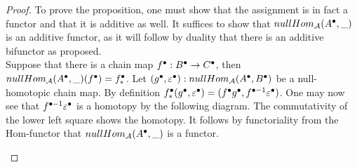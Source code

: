     \begin{proof}
        To prove the proposition, one must show that the assignment is in fact a functor and that it is additive as well. It suffices to show that $nullHom_{\mathcal{A}}(A^{\bullet},\_)$ is an additive functor, as it will follow by duality that there is an additive bifunctor as proposed. \\
        
        Suppose that there is a chain map $f^{\bullet}:B^{\bullet}\rightarrow C^{\bullet}$, then $nullHom_{\mathcal{A}}(A^{\bullet},\_)(f^{\bullet})=f^{\bullet}_*$. Let $(g^{\bullet},\varepsilon^{\bullet}):nullHom_{\mathcal{A}}(A^{\bullet},B^{\bullet})$ be a null-homotopic chain map. By definition $f^{\bullet}_*(g^{\bullet},\varepsilon^{\bullet})=(f^{\bullet}g^{\bullet},f^{\bullet-1}\varepsilon^{\bullet})$. One may now see that $f^{\bullet-1}\varepsilon^{\bullet}$ is a homotopy by the following diagram. The commutativity of the lower left square shows the homotopy. It follows by functoriality from the Hom-functor that $nullHom_{\mathcal{A}}(A^{\bullet},\_)$ is a functor.
        \begin{center}
        \end{center}


\end{proof}
